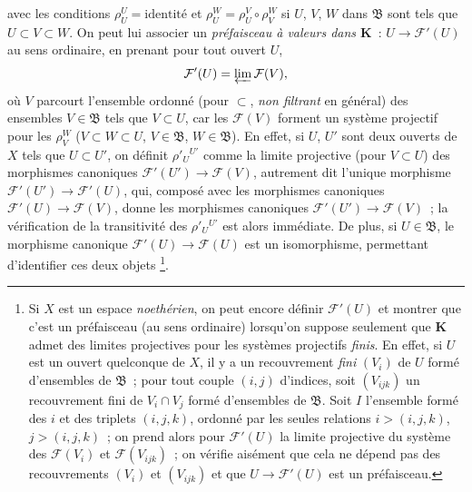 \begin{env}[3.2.1]
avec les conditions $\rho_U^U=\text{identité}$ et
$\rho_U^W=\rho_U^V\circ\rho_V^W$ si $U$, $V$, $W$ dans $\mathfrak{B}$ sont
tels que $U\subset V\subset W$. On peut lui associer un \emph{préfaisceau à
valeurs dans $\boldsymbol{K}$}~: $U\to\mathcal{F}'(U)$ au sens ordinaire, en
prenant pour tout ouvert $U$,
\[
  \mathcal{F}'(U)=\varprojlim\mathcal{F}(V),
\]
où $V$ parcourt l'ensemble ordonné (pour $\subset$, \emph{non filtrant} en
général) des ensembles $V\in\mathfrak{B}$ tels que $V\subset U$, car les
$\mathcal{F}(V)$ forment un système projectif pour les $\rho_V^W$
($V\subset W\subset U$, $V\in\mathfrak{B}$, $W\in\mathfrak{B}$). En effet,
si $U$, $U'$ sont deux ouverts de $X$ tels que $U\subset U'$, on définit
$\rho'_U{}^{U'}$ comme la limite projective (pour $V\subset U$) des morphismes
canoniques $\mathcal{F}'(U')\to\mathcal{F}(V)$, autrement dit l'unique
morphisme $\mathcal{F}'(U')\to\mathcal{F}'(U)$, qui, composé avec les
morphismes canoniques $\mathcal{F}'(U)\to\mathcal{F}(V)$, donne les morphismes
canoniques $\mathcal{F}'(U')\to\mathcal{F}(V)$~; la vérification de la
transitivité des $\rho'_U{}^{U'}$ est alors immédiate. De plus, si
$U\in\mathfrak{B}$, le morphisme canonique
$\mathcal{F}'(U)\to\mathcal{F}(U)$ est un isomorphisme, permettant d'identifier
ces deux objets%
\footnote{Si $X$ est un espace \emph{noethérien}, on peut encore définir
$\mathcal{F}'(U)$ et montrer que c'est un préfaisceau (au sens ordinaire)
lorsqu'on suppose seulement que $\boldsymbol{K}$ admet des limites projectives
pour les systèmes projectifs \emph{finis}. En effet, si $U$ est un ouvert
quelconque de $X$, il y a un recouvrement \emph{fini} $(V_i)$ de $U$ formé
d'ensembles de $\mathfrak{B}$~; pour tout couple $(i,j)$ d'indices, soit
$(V_{ijk})$ un recouvrement fini de $V_i\cap V_j$ formé d'ensembles de
$\mathfrak{B}$. Soit $I$ l'ensemble formé des $i$ et des triplets $(i,j,k)$,
ordonné par les seules relations $i>(i,j,k)$, $j>(i,j,k)$~; on prend alors
pour $\mathcal{F}'(U)$ la limite projective du système des $\mathcal{F}(V_i)$
et $\mathcal{F}(V_{ijk})$~; on vérifie aisément que cela ne dépend pas des
recouvrements $(V_i)$ et $(V_{ijk})$ et que $U\to\mathcal{F}'(U)$ est un
préfaisceau.}.
\end{env}

